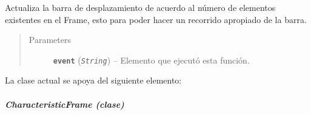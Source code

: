 \documentclass[letterpaper,10pt,english]{sphinxmanual}
\begin{document}
\begin{fulllineitems}
\begin{fulllineitems}
Actualiza la barra de desplazamiento de acuerdo al número de elementos
existentes en el Frame, esto para poder hacer un recorrido apropiado de 
la barra.
\begin{quote}\begin{description}
\item[{Parameters}] \leavevmode
\textbf{\texttt{event}} (\emph{\texttt{String}}) -- Elemento que ejecutó esta función.

\end{description}\end{quote}

\end{fulllineitems}


\end{fulllineitems}


La clase actual se apoya del siguiente elemento:


\subparagraph{CharacteristicFrame (clase)}
\label{View/Additional/MenuInternalOption/InternalOptionTab/CharacteristicFrame:module-View.Additional.MenuInternalOption.InternalOptionTab.CharacteristicFrame}\label{View/Additional/MenuInternalOption/InternalOptionTab/CharacteristicFrame::doc}\label{View/Additional/MenuInternalOption/InternalOptionTab/CharacteristicFrame:characteristicframe-clase}
\end{document}
